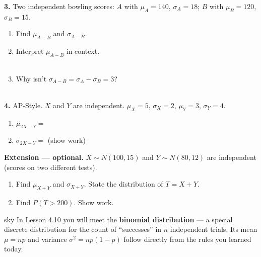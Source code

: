 \documentclass[10pt]{article}
\begin{document}
\begin{practicebox}
\textbf{3.} Two independent bowling scores: $A$ with $\mu_A = 140$, $\sigma_A = 18$;
$B$ with $\mu_B = 120$, $\sigma_B = 15$.

\begin{enumerate}[label=(\alph*), leftmargin=2em, itemsep=8pt]
  \item Find $\mu_{A-B}$ and $\sigma_{A-B}$.

        \vspace{0.3in}

  \item Interpret $\mu_{A-B}$ in context.\\
        \writeline\\[1pt]\writeline

  \item Why isn't $\sigma_{A-B} = \sigma_A - \sigma_B = 3$?\\
        \writeline\\[1pt]\writeline
\end{enumerate}

\vspace{0.14in}

\textbf{4.} AP-Style. $X$ and $Y$ are independent. $\mu_X = 5$, $\sigma_X = 2$,
$\mu_Y = 3$, $\sigma_Y = 4$.

\begin{enumerate}[label=(\alph*), leftmargin=2em, itemsep=8pt]
  \item $\mu_{2X-Y} = $ \blank{4cm}
  \item $\sigma_{2X-Y} = $ \blank{4cm} (show work)

        \vspace{0.25in}
\end{enumerate}

\end{practicebox}

\vspace{0.1in}

\begin{extensionbox}
\small
\textbf{Extension --- optional.}
$X \sim N(100, 15)$ and $Y \sim N(80, 12)$ are independent (scores on two different tests).
\begin{enumerate}[leftmargin=1.5em, itemsep=6pt]
  \item Find $\mu_{X+Y}$ and $\sigma_{X+Y}$. State the distribution of $T = X+Y$.

        \vspace{0.25in}

  \item Find $P(T > 200)$. Show work.

        \vspace{0.35in}
\end{enumerate}
\end{extensionbox}

\vspace{0.1in}

\begin{blurbbox}{sky}
\small
In Lesson 4.10 you will meet the \textbf{binomial distribution} --- a special discrete
distribution for the count of ``successes'' in $n$ independent trials. Its mean $\mu = np$
and variance $\sigma^2 = np(1-p)$ follow directly from the rules you learned today.
\end{blurbbox}
\end{document}
